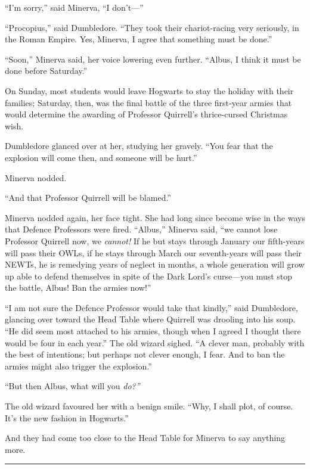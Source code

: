 ``I'm sorry,'' said Minerva, ``I don't---''

``Procopius,'' said Dumbledore. ``They took their chariot-racing very
seriously, in the Roman Empire. Yes, Minerva, I agree that something
must be done.''

``Soon,'' Minerva said, her voice lowering even further. ``Albus, I
think it must be done before Saturday.''

On Sunday, most students would leave Hogwarts to stay the holiday with
their families; Saturday, then, was the final battle of the three
first-year armies that would determine the awarding of Professor
Quirrell's thrice-cursed Christmas wish.

Dumbledore glanced over at her, studying her gravely. ``You fear that
the explosion will come then, and someone will be hurt.''

Minerva nodded.

``And that Professor Quirrell will be blamed.''

Minerva nodded again, her face tight. She had long since become wise in
the ways that Defence Professors were fired. ``Albus,'' Minerva said,
``we cannot lose Professor Quirrell now, we \emph{cannot!} If he but
stays through January our fifth-years will pass their OWLs, if he stays
through March our seventh-years will pass their NEWTs, he is remedying
years of neglect in months, a whole generation will grow up able to
defend themselves in spite of the Dark Lord's curse---you must stop the
battle, Albus! Ban the armies now!''

``I am not sure the Defence Professor would take that kindly,'' said
Dumbledore, glancing over toward the Head Table where Quirrell was
drooling into his soup. ``He did seem most attached to his armies,
though when I agreed I thought there would be four in each year.'' The
old wizard sighed. ``A clever man, probably with the best of intentions;
but perhaps not clever enough, I fear. And to ban the armies might also
trigger the explosion.''

``But then Albus, what will you \emph{do?''}

The old wizard favoured her with a benign smile. ``Why, I shall plot, of
course. It's the new fashion in Hogwarts.''

And they had come too close to the Head Table for Minerva to say
anything more.

\begin{center}\rule{3in}{0.4pt}\end{center}

